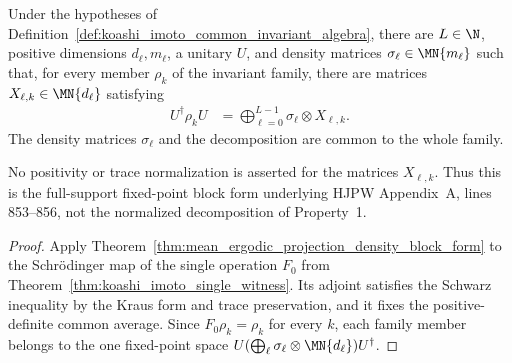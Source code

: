 \begin{theorem}
    \label{thm:koashi_imoto_family_fixed_point_block_form}
    \leanok
    Under the hypotheses of
    Definition~\ref{def:koashi_imoto_common_invariant_algebra}, there are
    $L\in\N$, positive dimensions $d_\ell,m_\ell$, a unitary $U$, and density
    matrices $\sigma_\ell\in\MN{m_\ell}$ such that, for every member $\rho_k$
    of the invariant family, there are matrices
    $X_{\ell,k}\in\MN{d_\ell}$ satisfying
    \begin{align}
        U^\dagger\rho_kU
        &=
        \bigoplus_{\ell=0}^{L-1}\sigma_\ell\otimes X_{\ell,k}.
        \label{eq:koashi_imoto_family_fixed_point_block_form}
    \end{align}
    The density matrices $\sigma_\ell$ and the decomposition are common to
    the whole family.

    No positivity or trace normalization is asserted for the matrices
    $X_{\ell,k}$. Thus this is the full-support fixed-point block form
    underlying HJPW Appendix~A, lines 853--856, not the normalized
    decomposition of Property~1.
\end{theorem}

\begin{proof}
    \leanok
    Apply
    Theorem~\ref{thm:mean_ergodic_projection_density_block_form} to the
    Schr\"odinger map of the single operation $F_0$ from
    Theorem~\ref{thm:koashi_imoto_single_witness}. Its adjoint satisfies the
    Schwarz inequality by the Kraus form and trace preservation, and it fixes
    the positive-definite common average. Since $F_0\rho_k=\rho_k$ for every
    $k$, each family member belongs to the one fixed-point space
    $U(\bigoplus_\ell\sigma_\ell\otimes\MN{d_\ell})U^\dagger$.
\end{proof}

